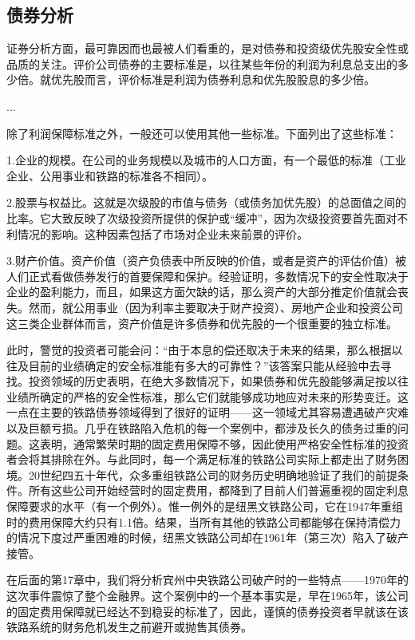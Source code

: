 \documentclass[12pt,oneside]{book}
\begin{document}
\subsection{债券分析}
证券分析方面，最可靠因而也最被人们看重的，是对债券和投资级优先股安全性或品质的关注。评价公司债券的主要标准是，以往某些年份的利润为利息总支出的多少倍。就优先股而言，评价标准是利润为债券利息和优先股股息的多少倍。

...

除了利润保障标准之外，一般还可以使用其他一些标准。下面列出了这些标准：

1.企业的规模。在公司的业务规模以及城市的人口方面，有一个最低的标准（工业企业、公用事业和铁路的标准各不相同）。

2.股票与权益比。这就是次级股的市值与债务（或债务加优先股）的总面值之间的比率。它大致反映了次级投资所提供的保护或“缓冲”，因为次级投资要首先面对不利情况的影响。这种因素包括了市场对企业未来前景的评价。

3.财产价值。资产价值（资产负债表中所反映的价值，或者是资产的评估价值）被人们正式看做债券发行的首要保障和保护。经验证明，多数情况下的安全性取决于企业的盈利能力，而且，如果这方面欠缺的话，那么资产的大部分推定价值就会丧失。然而，就公用事业（因为利率主要取决于财产投资）、房地产企业和投资公司这三类企业群体而言，资产价值是许多债券和优先股的一个很重要的独立标准。

此时，警觉的投资者可能会问：“由于本息的偿还取决于未来的结果，那么根据以往及目前的业绩确定的安全标准能有多大的可靠性？”该答案只能从经验中去寻找。投资领域的历史表明，在绝大多数情况下，如果债券和优先股能够满足按以往业绩所确定的严格的安全性标准，那么它们就能够成功地应对未来的形势变迁。这一点在主要的铁路债券领域得到了很好的证明——这一领域尤其容易遭遇破产灾难以及巨额亏损。几乎在铁路陷入危机的每一个案例中，都涉及长久的债务过重的问题。这表明，通常繁荣时期的固定费用保障不够，因此使用严格安全性标准的投资者会将其排除在外。与此同时，每一个满足标准的铁路公司实际上都走出了财务困境。20世纪四五十年代，众多重组铁路公司的财务历史明确地验证了我们的前提条件。所有这些公司开始经营时的固定费用，都降到了目前人们普遍重视的固定利息保障要求的水平（有一个例外）。惟一例外的是纽黑文铁路公司，它在1947年重组时的费用保障大约只有1.1倍。结果，当所有其他的铁路公司都能够在保持清偿力的情况下度过严重困难的时候，纽黑文铁路公司却在1961年（第三次）陷入了破产接管。

在后面的第17章中，我们将分析宾州中央铁路公司破产时的一些特点——1970年的这次事件震惊了整个金融界。这个案例中的一个基本事实是，早在1965年，该公司的固定费用保障就已经达不到稳妥的标准了，因此，谨慎的债券投资者早就该在该铁路系统的财务危机发生之前避开或抛售其债券。
\end{document}
